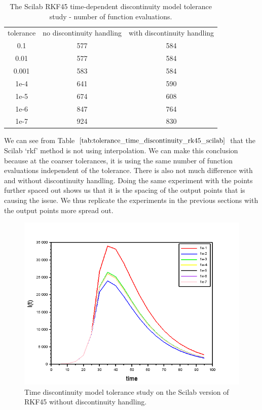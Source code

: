 \begin{table}[H]
\caption {The Scilab RKF45 time-dependent discontinuity model tolerance study - number of function evaluations.} 
\label{tab:tolerance_time_discontinuity_rk45_scilab} 
\begin{center}
\begin{tabular}{ c c c }
tolerance & no discontinuity handling & with discontinuity handling\\ 
0.1 & 577 & 584 \\
0.01 & 577 & 584 \\
0.001 & 583 & 584 \\
1e-4 & 641 & 590 \\
1e-5 & 674 & 608 \\
1e-6 & 847 & 764 \\
1e-7 & 924 & 830 \\
\end{tabular}
\end{center}
\end{table}
We can see from Table $\ref{tab:tolerance_time_discontinuity_rk45_scilab}$ that the Scilab `rkf' method is not using interpolation. We can make this conclusion because at the coarser tolerances, it is using the same number of function evaluations independent of the tolerance. There is also not much difference with and without discontinuity handling. Doing the same experiment with the points further spaced out shows us that it is the spacing of the output points that is causing the issue. We thus replicate the experiments in the previous sections with the output points more spread out.
\begin{figure}[H]
\centering
\includegraphics[width=0.7\linewidth]{./figures/tolerance_time_rkf_further_no_event_sci}
\caption{Time discontinuity model tolerance study on the Scilab version of RKF45 without discontinuity handling.}
\label{fig:tolerance_time_rkf_further_no_event_sci}
\end{figure}

